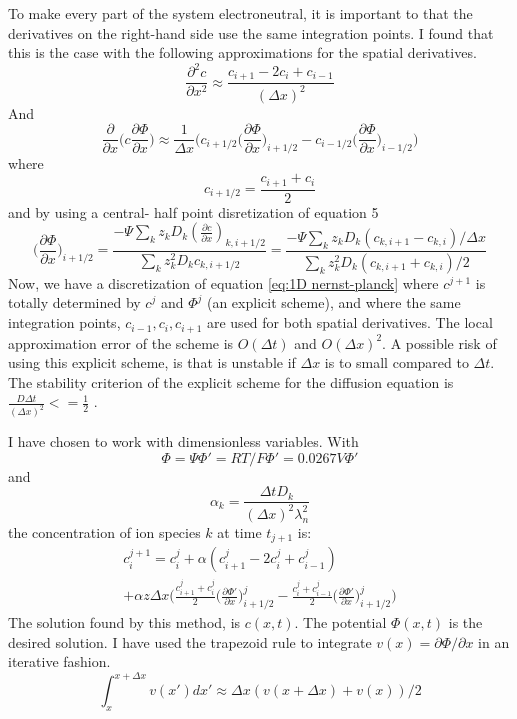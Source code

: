 \documentclass{article}
\begin{document}
To make every part of the system electroneutral, it is important to that the derivatives on the right-hand side use the same integration points. I found that this is the case with the following approximations for the spatial derivatives. 
$$\frac{\partial^2 c}{\partial x^2} \approx \frac{c_{i+1}-2c_i+c_{i-1}}{(\Delta x)^2}$$
And 
$$\frac{\partial }{\partial x}  \bigg(c \frac{\partial \Phi}{\partial x} \bigg)\approx \frac{1}{\Delta x}\bigg( c_{i+1/2} \big(\frac{\partial \Phi}{\partial x}\big)_{i+1/2} -  c_{i-1/2} \big(\frac{\partial \Phi}{\partial x}\big)_{i-1/2} \bigg) $$
where 
$$c_{i+ 1/2} = \frac{c_{i+1}+ c_i}{2}$$
and by using a central- half point disretization of equation 5
\begin{equation}\label{eq:gradPhi}
\big(\frac{\partial \Phi}{\partial x}\big)_{i+1/2} = \frac{-\Psi \sum_k z_k D_k (\frac{\partial c}{\partial x})_{k,i+1/2}}{\sum_k z_k^2 D_k c_{k,i+1/2}}= \frac{-\Psi \sum_k z_k D_k (c_{k,i+1}-c_{k,i})/\Delta x }{\sum_k z_k^2 D_k (c_{k,i+1}+c_{k,i})/2}
\end{equation}
Now, we have a discretization of equation \ref{eq:1D nernst-planck} where $c^{j+1}$ is totally determined by $c^j$ and $\Phi^j$ (an explicit scheme), and where the same integration points, $c_{i-1}, c_i, c_{i+1}$ are used for both spatial derivatives. The local approximation error of the scheme is $O(\Delta t)$ and $O(\Delta x)^2$. A possible risk of using this explicit scheme, is that is unstable if $\Delta x$ is to small compared to $\Delta t$. The stability criterion of the explicit scheme for the diffusion equation is $\frac{D\Delta t}{(\Delta x)^2} <= \frac{1}{2}$ \cite{lecturenotes}.

I have chosen to work with dimensionless variables. With $$\Phi = \Psi\Phi' = RT/F\Phi' = 0.0267V \Phi'$$ and $$\alpha_k = \frac{\Delta t D_k}{(\Delta x)^2 \lambda_n^2}$$ the concentration of ion species $k$ at time $t_{j+1}$ is:
\begin{multline}\label{eq:c_i+1}
 c_i^{j+1}= c_i^j + \alpha(c_{i+1}^j-2c_i^j+c_{i-1}^j)\\ + \alpha z\Delta x \bigg(\frac{c_{i+1}^j+c_i^j}{2} \big(\frac{\partial \Phi'}{\partial x}\big)_{i+1/2}^j-\frac{c_{i}^j+c_{i-1}^j}{2} \big(\frac{\partial \Phi'}{\partial x}\big)_{i+1/2}^j\bigg)
\end{multline}
The solution found by this method, is $c(x,t)$. The potential $\Phi(x,t)$ is the desired solution. I have used the trapezoid rule to integrate $v(x) =\partial \Phi / \partial x$ in an iterative fashion.
\begin{equation}
\int_x^{x+\Delta x}v(x') dx'  \approx \Delta x ( v(x+\Delta x) + v(x) )/2
\end{equation}
\end{document}

